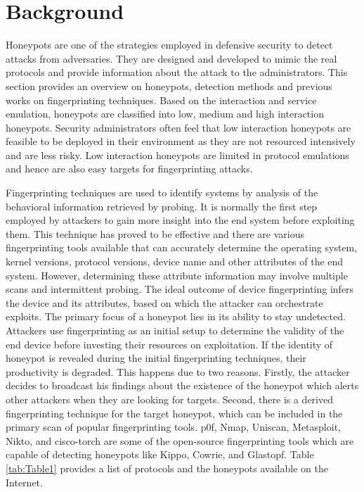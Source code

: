 \section{Background}
\label{sec:back}

Honeypots are one of the strategies employed in defensive security to detect attacks from adversaries. They are designed and developed to mimic the real protocols and provide information about the attack to the administrators. This section provides an overview on honeypots, detection methods and previous works on fingerprinting techniques. Based on the interaction and service emulation, honeypots are classified into low, medium and high interaction honeypots. Security administrators often feel that low interaction honeypots are feasible to be deployed in their environment as they are not resourced intensively and are less risky. Low interaction honeypots are limited in protocol emulations and hence are also easy targets for fingerprinting attacks. 

Fingerprinting techniques are used to identify systems by analysis of the behavioral information retrieved by probing. It is normally the first step employed by attackers to gain more insight into the end system before exploiting them. This technique has proved to be effective and there are various fingerprinting tools available that can accurately determine the operating system, kernel versions, protocol versions, device name and other attributes of the end system. However, determining these attribute information may involve multiple scans and intermittent probing. The ideal outcome of device fingerprinting infers the device and its attributes, based on which the attacker can orchestrate exploits. The primary focus of a honeypot lies in its ability to stay undetected. Attackers use fingerprinting as an initial setup to determine the validity of the end device before investing their resources on exploitation. If the identity of honeypot is revealed during the initial fingerprinting techniques, their productivity is degraded. This happens due to two reasons. Firstly, the attacker decides to broadcast his findings about the existence of the honeypot which alerts other attackers when they are looking for targets. Second, there is a derived fingerprinting technique for the target honeypot, which can be included in the primary scan of popular fingerprinting tools. p0f, Nmap, Uniscan, Metasploit, Nikto, and cisco-torch are some of the open-source fingerprinting tools which are capable of detecting honeypots like Kippo, Cowrie, and Glastopf. Table \ref{tab:Table1} provides a list of protocols and the honeypots available on the Internet. 

